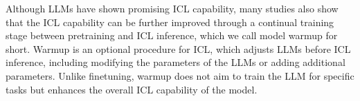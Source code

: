 
Although LLMs have shown promising ICL capability, many studies also show that the ICL capability can be further improved through a continual training stage between pretraining and ICL inference, which we call model warmup for short.  %
Warmup is an optional procedure for ICL, which adjusts LLMs before ICL inference, including modifying the parameters of the LLMs or adding additional parameters. Unlike finetuning, warmup does not aim to train the LLM for specific tasks but enhances the overall ICL capability of the model. 



